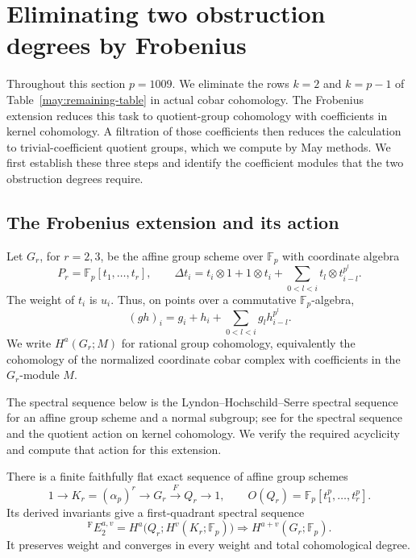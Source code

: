 \section{Eliminating two obstruction degrees by Frobenius}
\label{frob:section}

Throughout this section $p=1009$.  We eliminate the rows $k=2$ and
$k=p-1$ of Table~\ref{may:remaining-table} in actual cobar cohomology.
The Frobenius extension reduces this task to quotient-group cohomology
with coefficients in kernel cohomology.  A filtration of those coefficients
then reduces the calculation to trivial-coefficient quotient groups, which
we compute by May methods.  We first establish these three steps and identify
the coefficient modules that the two obstruction degrees require.

\subsection{The Frobenius extension and its action}

Let $G_r$, for $r=2,3$, be the affine group scheme over
$\mathbb F_p$ with coordinate algebra
\[
 P_r=\mathbb F_p[t_1,\ldots,t_r],\qquad
 \Delta t_i=t_i\otimes1+1\otimes t_i+
       \sum_{0<l<i}t_l\otimes t_{i-l}^{p^l}.
\]
The weight of $t_i$ is $u_i$.  Thus, on points over a commutative
$\mathbb F_p$-algebra,
\begin{equation}\label{frob:group-law}
 (g h)_i=g_i+h_i+\sum_{0<l<i}g_lh_{i-l}^{p^l}.
\end{equation}
We write $H^a(G_r;M)$ for rational group cohomology, equivalently the
cohomology of the normalized coordinate cobar complex with coefficients
in the $G_r$-module $M$.

The spectral sequence below is the Lyndon--Hochschild--Serre spectral
sequence for an affine group scheme and a normal subgroup; see
\citet[Part~I, Proposition~6.6(3) and Section~6.7]{Jantzen1985} for
the spectral sequence and the quotient action on kernel cohomology.
We verify the required acyclicity and compute that action for this extension.

\begin{lemma}\label{frob:extension}
There is a finite faithfully flat exact sequence of affine group schemes
\begin{equation}\label{frob:exact-sequence}
 1\longrightarrow K_r=(\alpha_p)^r\longrightarrow G_r
   \xrightarrow{F} Q_r\longrightarrow1,
 \qquad O(Q_r)=\mathbb F_p[t_1^p,\ldots,t_r^p].
\end{equation}
Its derived invariants give a first-quadrant spectral sequence
\begin{equation}\label{frob:lhss}
 {}^{\mathrm F}E_2^{a,v}
   =H^a\bigl(Q_r;H^v(K_r;\mathbb F_p)\bigr)
   \Longrightarrow H^{a+v}(G_r;\mathbb F_p).
\end{equation}
It preserves weight and converges in every weight and total
cohomological degree.
\end{lemma}

